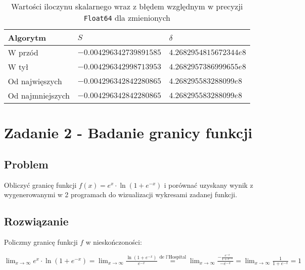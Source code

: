 \documentclass[12pt]{article}
\begin{document}
        \begin{table}[h!]
            \vspace{20pt}
            \centering
            \begin{tabularx}{0.78\textwidth}{l l l}
                \hline
                Algorytm & $S$ & $\delta$ \\
                \hline
                W przód & $-0.004296342739891585$ & $4.2682954815672344e8$ \\
                W tył & $-0.004296342998713953$ & $4.2682957386999655e8$ \\
                Od najwięszych & $-0.004296342842280865$ & $4.268295583288099e8$ \\
                Od najmniejszych & $-0.004296342842280865$ & $4.268295583288099e8$ \\
                \hline
            \end{tabularx}
            \caption{Wartości iloczynu skalarnego wraz z błędem względnym w precyzji \texttt{Float64} dla zmienionych}
            \label{table:dot_prod_64_mod}
        \end{table}

\newpage

\section*{Zadanie 2 - Badanie granicy funkcji}
    \subsection*{Problem}
        Obliczyć granicę funkcji $f(x) = e^x \cdot \ln(1 + e^{-x})$ i porównać uzyskany wynik z wygenerowanymi w 2 programach do wizualizacji wykresami zadanej funkcji.
        \newline

    \subsection*{Rozwiązanie}
        Policzmy granicę funkcji $f$ w nieskończoności:

        \begin{center}
        \begin{math}
            \lim_{x \rightarrow \infty} e^x \cdot \ln(1 + e^{-x}) = \lim_{x \rightarrow \infty} \frac{\ln (1+e^{-x})}{e^{-x}} \overset{\text{de l'Hospital}}{=} \lim_{x \rightarrow \infty} \frac{-\frac{e^{-x}}{1+e^{-x}}}{-e^{-x}} = \lim_{x \rightarrow \infty} \frac{1}{1+e^{-x}} = 1
        \end{math}
        \end{center}
\end{document}
